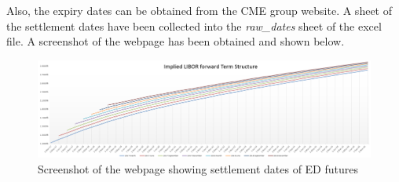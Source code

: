 Also, the expiry dates can be obtained from the CME group website. A sheet of the settlement dates have been collected into the \emph{raw\_dates} sheet of the excel file. A screenshot of the webpage has been obtained and shown below.
\begin{figure}[h]
	\centering
	\includegraphics[scale=0.5]{biu.PNG}
	\caption{Screenshot of the webpage showing settlement dates of ED futures}
\end{figure}
\newpage

